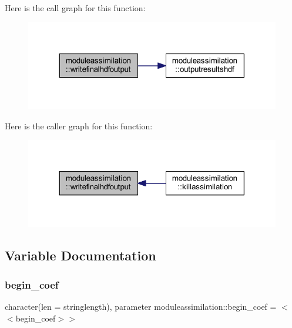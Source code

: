 Here is the call graph for this function\+:\nopagebreak
\begin{figure}[H]
\begin{center}
\leavevmode
\includegraphics[width=316pt]{namespacemoduleassimilation_a68cb52758df87c362f43dd3e9690121b_cgraph}
\end{center}
\end{figure}
Here is the caller graph for this function\+:\nopagebreak
\begin{figure}[H]
\begin{center}
\leavevmode
\includegraphics[width=316pt]{namespacemoduleassimilation_a68cb52758df87c362f43dd3e9690121b_icgraph}
\end{center}
\end{figure}


\subsection{Variable Documentation}
\mbox{\label{namespacemoduleassimilation_a36b7146a3f9058e33923acb96c85e214}} 
\subsubsection{\texorpdfstring{begin\+\_\+coef}{begin\_coef}}
{\footnotesize\ttfamily character(len = stringlength), parameter moduleassimilation\+::begin\+\_\+coef = \textquotesingle{}$<$$<$begin\+\_\+coef$>$$>$\textquotesingle{}\hspace{0.3cm}{\ttfamily [private]}}


